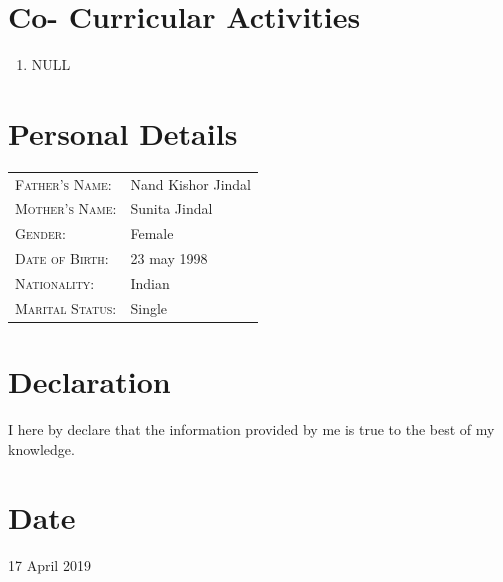 \documentclass{article}
\begin{document}
	\section{Co- Curricular Activities}
		\begin{enumerate}
			\item{  NULL}
		\end{enumerate}
	\section{Personal Details}
		\begin{tabular}{ll}\\
			\textsc{Father's Name: }& Nand Kishor Jindal\\
			\textsc{Mother's Name: }&Sunita Jindal\\
			\textsc{Gender: }&Female\\
			\textsc{Date of Birth: }&23 may 1998\\
			\textsc{Nationality: }&Indian\\
			\textsc{Marital Status: }& Single\\
		\end{tabular}
	\section{Declaration}
		I here by declare that the information provided by me is true to the best of my knowledge.
	\section{Date}
		17 April 2019
\end{document}
